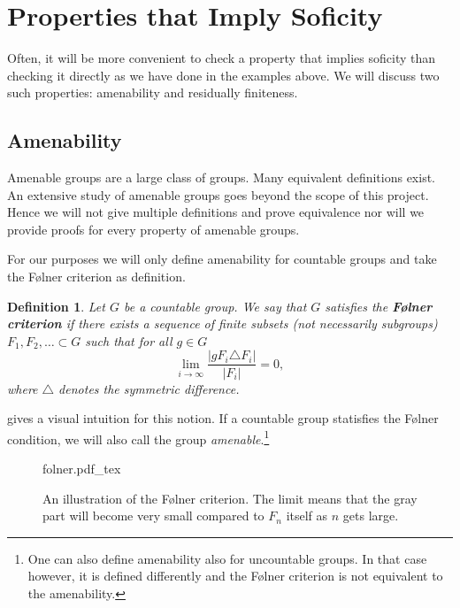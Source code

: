 \documentclass[titlepage, a4paper]{article}
\newcommand{\N}{\mathbb{N}}
\newcommand{\card}[1]{\left| #1 \right|}
\newtheorem{definition}[theorem]{Definition}
\theoremstyle{remark}
\newcommand{\incfig}[1]{%
    \def\svgwidth{.5\columnwidth}
    {#1.pdf_tex}
}
\begin{document}
    \section{Properties that Imply Soficity}


    Often, it will be more convenient to check a property that implies soficity than checking it directly as we have done in the examples above. We will discuss two such properties: amenability and residually finiteness.

    \subsection{Amenability}

    Amenable groups are a large class of groups. 
    Many equivalent definitions exist. 
    An extensive study of amenable groups goes beyond the scope of this project. Hence we will not give multiple definitions and prove equivalence nor will we provide proofs for every property of amenable groups.

    For our purposes we will only define amenability for countable groups and take the Følner criterion as definition.
    \begin{definition}\cite{noauthor_folner_2019} \label{def:folner} 
	    Let $G$ be a countable group. We say that $G$ satisfies the \textbf{Følner criterion} if there exists a sequence of finite subsets (not necessarily subgroups) $F_1, F_2, \dots \subset G$ such that for all $g \in G$ 
        \[
        \lim_{i\to \infty} \frac{\card{gF_i \triangle F_i}}{\card{F_i}} = 0,
        \]
        where $\triangle$ denotes the symmetric difference.
    \end{definition}
     gives a visual intuition for this notion. 
If a countable group statisfies the Følner condition, we will also call the group \emph{amenable}.\footnote{One can also define amenability also for uncountable groups. In that case however, it is defined differently and the Følner criterion is not equivalent to the amenability.} 

\begin{figure}[ht]
    \centering
    \incfig{folner}
    \caption{An illustration of the Følner criterion. The limit means that the gray part will become very small compared to  $F_n$ itself as $n$ gets large.}
    \label{fig:folner}
\end{figure}
\end{document}
